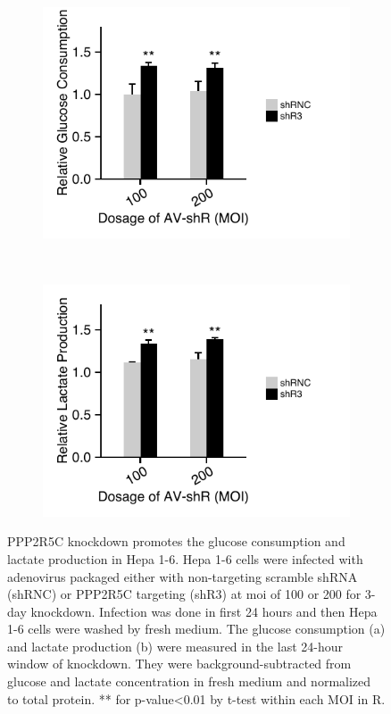 \begin{figure}[htbp]
\centering
	\begin{subfigure}[t]{0.48\textwidth}
	\includegraphics[width=1\textwidth]{figs/fig2-10a glucose kd.pdf}
    \label{fig:fig2.10a}
	\end{subfigure} %
~
	\begin{subfigure}[t]{0.48\textwidth}
	\includegraphics[width=1\textwidth]{figs/fig2-10b lactate kd.pdf}
    \label{fig:fig2.10b}
	\end{subfigure}
\caption[PPP2R5C KD increases glycolysis in Hepa 1-6]{\footnotesize PPP2R5C knockdown promotes the glucose consumption and lactate production in Hepa 1-6. Hepa 1-6 cells were infected with adenovirus packaged either with non-targeting scramble shRNA (shRNC) or PPP2R5C targeting (shR3) at \gls{moi} of 100 or 200 for 3-day knockdown. Infection was done in first 24 hours and then Hepa 1-6 cells were washed by fresh medium. The glucose consumption (a) and lactate production (b) were measured in the last 24-hour window of knockdown. They were background-subtracted from glucose and lactate concentration in fresh medium and normalized to total protein. ** for p-value<0.01 by t-test within each MOI in R.}
\label{fig:fig2.10}
\end{figure}

